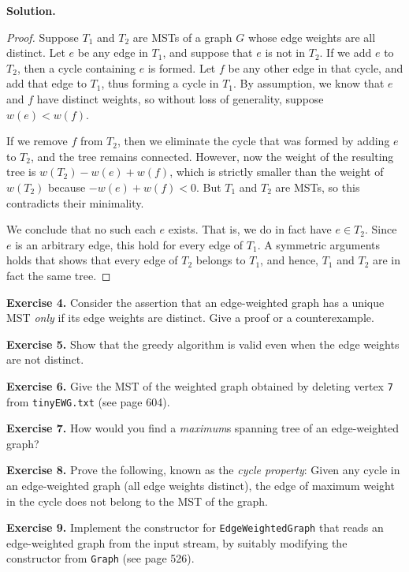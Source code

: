\documentclass[12pt, a4paper]{article}
\newenvironment{ex}[2][Exercise]
{\par\medskip\noindent \textbf{#1 #2.}}
{\medskip}
\newenvironment{sol}[1][Solution]
{\par\medskip\noindent \textbf{#1.} }
{\medskip}
\begin{document}
	\begin{sol}
		\begin{proof}
			Suppose $T_1$ and $T_2$ are MSTs of a graph $G$ whose edge weights
			are all distinct. Let $e$ be any edge in $T_1$, and suppose that
			$e$ is not in $T_2$. If we add $e$ to $T_2$, then a cycle containing
			$e$ is formed. Let $f$ be any other edge in that cycle, and add
			that edge to $T_1$, thus forming a cycle in $T_1$. By assumption,
			we know that $e$ and $f$ have distinct weights, so without loss
			of generality, suppose $w(e)<w(f)$.
			
			If we remove $f$ from $T_2$, then we eliminate the cycle that was formed
			by adding $e$ to $T_2$, and the tree remains connected. However, now the weight
			of the resulting tree is $w(T_2)-w(e)+w(f)$, which is strictly smaller
			than the weight of $w(T_2)$ because $-w(e)+w(f)<0$. But $T_1$ and
			$T_2$ are MSTs, so this contradicts their minimality.
			
			We conclude that no such each $e$ exists. That is, we do in fact have
			$e\in T_2$. Since $e$ is an arbitrary edge, this hold for every edge of $T_1$.
			A symmetric arguments holds that shows that every edge of $T_2$
			belongs to $T_1$, and hence, $T_1$ and $T_2$ are in fact the
			same tree.
		\end{proof}
	\end{sol}
	\begin{ex}{4}
		Consider the assertion that an edge-weighted graph has a unique MST \emph{only} if
		its edge weights are distinct. Give a proof or a counterexample.
	\end{ex}
	\begin{ex}{5}
		Show that the greedy algorithm is valid even when the edge weights are not distinct.
	\end{ex}
	\begin{ex}{6}
		Give the MST of the weighted graph obtained by deleting vertex \texttt{7} from
		\texttt{tinyEWG.txt} (see page 604).
	\end{ex}
	\begin{ex}{7}
		How would you find a \emph{maximum}s spanning tree of an edge-weighted graph?
	\end{ex}
	\begin{ex}{8}
		Prove the following, known as the \emph{cycle property}: Given any cycle in an
		edge-weighted graph (all edge weights distinct), the edge of maximum weight in
		the cycle does not belong to the MST of the graph.
	\end{ex}
	\begin{ex}{9}
		Implement the constructor for \texttt{EdgeWeightedGraph} that reads an edge-weighted
		graph from the input stream, by suitably modifying the constructor from \texttt{Graph}
		(see page 526).
	\end{ex}
\end{document}
